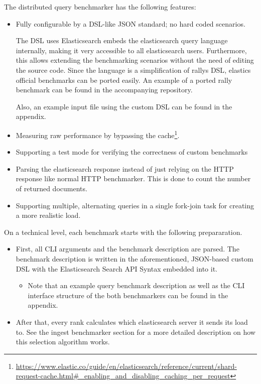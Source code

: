 The distributed query benchmarker has the following features:
\begin{itemize}
  \item Fully configurable by a \ac{DSL}-like \ac{JSON} standard; no hard coded scenarios.

    The \ac{DSL} uses Elasticsearch embeds the elasticsearch query language internally, making it very accessible to all elasticsearch users. Furthermore, this allows extending the benchmarking scenarios without the need of editing the source code. Since the language is a simplification of rallys \ac{DSL}, elastics official benchmarks can be ported easily. An example of a ported rally benchmark can be found in the accompanying repository.

    Also, an example input file using the custom \ac{DSL} can be found in the appendix.
  \item Measuring raw performance by bypassing the cache\footnote{\url{https://www.elastic.co/guide/en/elasticsearch/reference/current/shard-request-cache.html\#_enabling_and_disabling_caching_per_request}}.
  \item Supporting a test mode for verifying the correctness of custom benchmarks
  \item Parsing the elasticsearch response instead of just relying on the HTTP response like normal HTTP benchmarker. This is done to count the number of returned documents.
  \item Supporting multiple, alternating queries in a single fork-join task for creating a more realistic load.
\end{itemize}

On a technical level, each benchmark starts with the following prepararation.
\begin{itemize}
  \item First, all \ac{CLI} arguments and the benchmark description are parsed. The benchmark description is written in the aforementioned, JSON-based custom DSL with the Elasticsearch Search API Syntax embedded into it. 
    \begin{itemize}
      \item Note that an example query benchmark description as well as the \ac{CLI} interface structure of the both benchmarkers can be found in the appendix.
    \end{itemize}
  \item After that, every rank calculates which elasticsearch server it sends its load to. See the ingest benchmarker section for a more detailed description on how this selection algorithm works.
\end{itemize}

